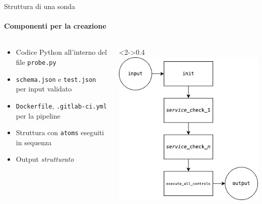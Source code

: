 \documentclass{beamer}
\begin{document}
\begin{frame}{Struttura di una sonda}
    \framesubtitle{Componenti per la creazione}
    \begin{columns}
        \begin{column}{0.6\textwidth}
            \begin{itemize}
                \item<1-> Codice Python all'interno del file \texttt{probe.py}
                \item \texttt{schema.json} e \texttt{test.json} per input validato
                \item \texttt{Dockerfile}, \texttt{.gitlab-ci.yml} per la pipeline
                \item<2-> Struttura con \texttt{atoms} eseguiti in sequenza
                \item<2-> Output \emph{strutturato}
            \end{itemize}
        \end{column}
        \begin{column}<2->{0.4\textwidth}
            \includegraphics[width=\textwidth]{assets/flow.drawio.png}
        \end{column}
    \end{columns}
\end{frame}
\end{document}
